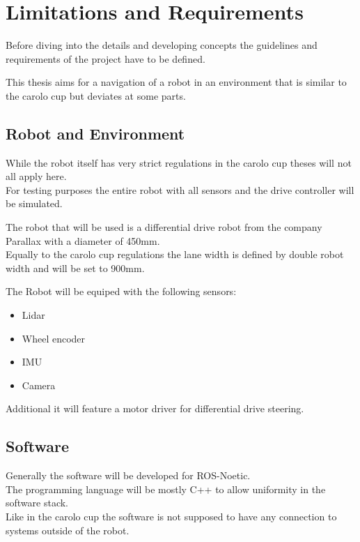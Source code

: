 \chapter{Limitations and Requirements}
\label{Limitations and Requirements}


Before diving into the details and developing concepts the guidelines and requirements of the project have to be defined.

This thesis aims for a navigation of a robot in an environment that is similar to the carolo cup but deviates at some parts.

\section{Robot and Environment}
While the robot itself has very strict regulations in the carolo cup theses will not all apply here.\\

For testing purposes the entire robot with all sensors and the drive controller will be simulated.

The robot that will be used is a differential drive robot from the company Parallax with a diameter of 450mm.\\

Equally to the carolo cup regulations the lane width is defined by double robot width and will be set to 900mm. 

The Robot will be equiped with the following sensors:

\begin{itemize}
	\item Lidar
	\item Wheel encoder
	\item IMU
	\item Camera
\end{itemize}

Additional it will feature a motor driver for differential drive steering.

\section{Software}
Generally the software will be developed for ROS-Noetic.\\
The programming language will be mostly C++ to allow uniformity in the software stack.\\
Like in the carolo cup the software is not supposed to have any connection to systems outside of the robot.\\

